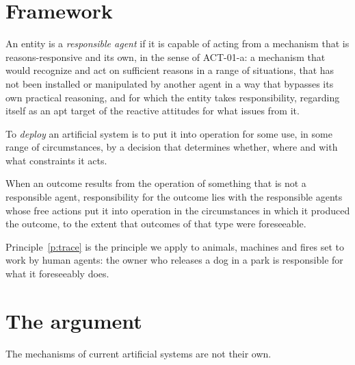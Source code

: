 \documentclass{situationist-preprint}
\begin{document}
\section{Framework}

\begin{definition}\label{d:resp}
An entity is a \emph{responsible agent} if it is capable of acting from a mechanism that is reasons-responsive and its own, in the sense of ACT-01-a: a mechanism that would recognize and act on sufficient reasons in a range of situations, that has not been installed or manipulated by another agent in a way that bypasses its own practical reasoning, and for which the entity takes responsibility, regarding itself as an apt target of the reactive attitudes for what issues from it.
\end{definition}

\begin{definition}[Deployment]\label{d:deploy}
To \emph{deploy} an artificial system is to put it into operation for some use, in some range of circumstances, by a decision that determines whether, where and with what constraints it acts.
\end{definition}

\begin{principle}[Tracing]\label{p:trace}
When an outcome results from the operation of something that is not a responsible agent, responsibility for the outcome lies with the responsible agents whose free actions put it into operation in the circumstances in which it produced the outcome, to the extent that outcomes of that type were foreseeable.
\end{principle}

Principle~\ref{p:trace} is the principle we apply to animals, machines and fires set to work by human agents: the owner who releases a dog in a park is responsible for what it foreseeably does.

\section{The argument}

\begin{proposition}\label{p:notown}
The mechanisms of current artificial systems are not their own.
\end{proposition}
\end{document}
